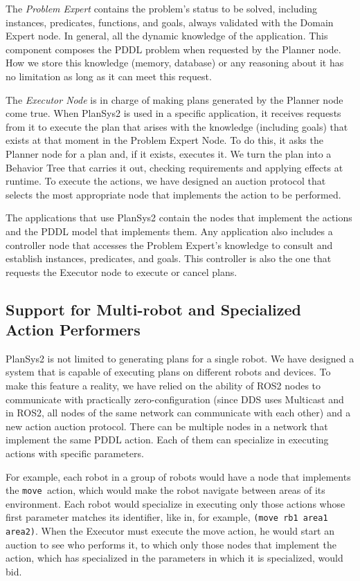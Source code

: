 \documentclass[letterpaper, 10 pt, conference]{IEEEtran}
\begin{document}
The \emph{Problem Expert} contains the problem's status to be solved, including instances, predicates, functions, and goals, always validated with the Domain Expert node. In general, all the dynamic knowledge of the application. This component composes the PDDL problem when requested by the Planner node. How we store this knowledge (memory, database) or any reasoning about it has no limitation as long as it can meet this request.

The \emph{Executor Node} is in charge of making plans generated by the Planner node come true. When PlanSys2 is used in a specific application, it receives requests from it to execute the plan that arises with the knowledge (including goals) that exists at that moment in the Problem Expert Node. To do this, it asks the Planner node for a plan and, if it exists, executes it. We turn the plan into a Behavior Tree that carries it out, checking requirements and applying effects at runtime. To execute the actions, we have designed an auction protocol that selects the most appropriate node that implements the action to be performed.

The applications that use PlanSys2 contain the nodes that implement the actions and the PDDL model that implements them. Any application also includes a controller node that accesses the Problem Expert's knowledge to consult and establish instances, predicates, and goals. This controller is also the one that requests the Executor node to execute or cancel plans.

\subsection{Support for Multi-robot and Specialized Action Performers}
\label{sec:multi}
PlanSys2 is not limited to generating plans for a single robot. We have designed a system that is capable of executing plans on different robots and devices. To make this feature a reality, we have relied on the ability of ROS2 nodes to communicate with practically zero-configuration (since DDS uses Multicast and in ROS2, all nodes of the same network can communicate with each other) and a new action auction protocol. There can be multiple nodes in a network that implement the same PDDL action. Each of them can specialize in executing actions with specific parameters. 

For example, each robot in a group of robots would have a node that implements the \small\texttt{move }\normalsize action, which would make the robot navigate between areas of its environment. Each robot would specialize in executing only those actions whose first parameter matches its identifier, like in, for example, \small\texttt{(move rb1 area1 area2)}\normalsize. When the Executor must execute the move action, he would start an auction to see who performs it, to which only those nodes that implement the action, which has specialized in the parameters in which it is specialized, would bid. 
\end{document}
